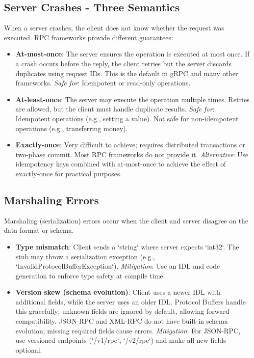 \documentclass[a4paper]{article}
\begin{document}
\subsection{Server Crashes - Three Semantics}
When a server crashes, the client does not know whether the request was executed. RPC frameworks provide different guarantees:

\begin{itemize}
    \item \textbf{At-most-once}: The server ensures the operation is executed at most once. If a crash occurs before the reply, the client retries but the server discards duplicates using request IDs. This is the default in gRPC and many other frameworks.  
        \textit{Safe for}: Idempotent or read-only operations.

    \item \textbf{At-least-once}: The server may execute the operation multiple times. Retries are allowed, but the client must handle duplicate results.  
        \textit{Safe for}: Idempotent operations (e.g., setting a value). Not safe for non-idempotent operations (e.g., transferring money).

    \item \textbf{Exactly-once}: Very difficult to achieve; requires distributed transactions or two-phase commit. Most RPC frameworks do not provide it.  
        \textit{Alternative}: Use idempotency keys combined with at-most-once to achieve the effect of exactly-once for practical purposes.
\end{itemize}

\subsection{Marshaling Errors}
Marshaling (serialization) errors occur when the client and server disagree on the data format or schema.

\begin{itemize}
    \item \textbf{Type mismatch}: Client sends a `string` where server expects `int32`. The stub may throw a serialization exception (e.g., `InvalidProtocolBufferException`).  
        \textit{Mitigation}: Use an IDL and code generation to enforce type safety at compile time.

    \item \textbf{Version skew (schema evolution)}: Client uses a newer IDL with additional fields, while the server uses an older IDL. Protocol Buffers handle this gracefully: unknown fields are ignored by default, allowing forward compatibility. JSON-RPC and XML-RPC do not have built-in schema evolution; missing required fields cause errors.  
        \textit{Mitigation}: For JSON-RPC, use versioned endpoints (`/v1/rpc`, `/v2/rpc`) and make all new fields optional.
\end{itemize}
\end{document}
